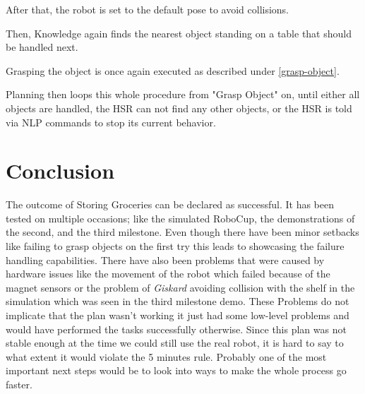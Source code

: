 \documentclass[main.tex]{subfiles}
\begin{document}
	
	\begin{manipulation}
	After that, the robot is set to the default pose to avoid collisions.
	\end{manipulation}
	
	
	\begin{knowledge}
	Then, Knowledge again finds the nearest object standing on a table that should be handled next.
	\end{knowledge}
	
	\begin{manipulation}
	Grasping the object is once again executed as described under \ref{grasp-object}.
	\end{manipulation}
	
	\begin{planning}
	Planning then loops this whole procedure from "Grasp Object" on, until either all objects are handled, the HSR can not find any other objects, or the HSR is told via NLP commands to stop its current behavior.
	\end{planning}	
	
	\section{Conclusion}

	The outcome of Storing Groceries can be declared as successful. It has been tested on multiple occasions; like the simulated RoboCup, the demonstrations of the second, and the third milestone. 
	Even though there have been minor setbacks like failing to grasp objects on the first try this leads to showcasing the failure handling capabilities.
	There have also been problems that were caused by hardware issues like the movement of the robot which failed because of the magnet sensors or the problem of \textit{Giskard} avoiding collision with the shelf in the simulation which was seen in the third milestone demo.
	These Problems do not implicate that the plan wasn't working it just had some low-level problems and would have performed the tasks successfully otherwise.
	Since this plan was not stable enough at the time we could still use the real robot, it is hard to say to what extent it would violate the 5 minutes rule. Probably one of the most important next steps would be to look into ways to make the whole process go faster.
	
	\endgroup
	
\end{document}
